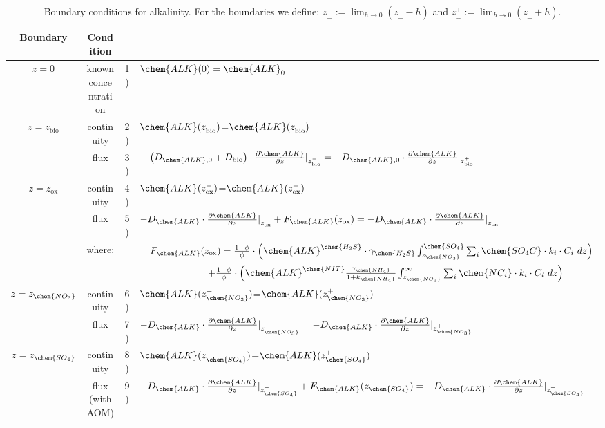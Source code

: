 \documentclass[gmd, manuscript]{copernicus}
\begin{document}
\begin{table}[tbp]
\caption{Boundary conditions for alkalinity. For the boundaries we define:  $z^-_{\_\_} := \lim_{h\to0} (z_{\_\_}-h)$ and $z^+_{\_\_} := \lim_{h\to0} (z_{\_\_}+h)$.}
\centering
\begin{tabular}{ |c| c| c l|}
\hline
\textbf{Boundary}& \textbf{Condition}&&\\
\hline
$z=0$& known concentration& 1)& $\chem{ALK}(0)=\chem{ALK}_{0}$  \\
$z=z_{\mathrm{bio}}$&continuity& 2)& $\chem{ALK}(z_{\mathrm{bio}}^-)$=$\chem{ALK}(z_{\mathrm{bio}}^+)$\\
               & flux & 3)& $-\left(D_{\chem{ALK},0}+D_{\mathrm{bio}}\right )\cdot \frac{\partial \chem{ALK}}{\partial z}|_{z_{\mathrm{bio}}^-}=-D_{\chem{ALK},0} \cdot \frac{\partial \chem{ALK}}{\partial z}|_{z_{\mathrm{bio}}^+}$\\
$z=z_{\mathrm{ox}}$& continuity& 4)& $\chem{ALK}(z_{\mathrm{ox}}^-)$=$\chem{ALK}(z_{\mathrm{ox}}^+)$\\
               & flux & 5)& $-D_{\chem{ALK}} \cdot \frac{\partial \chem{ALK}}{\partial z}|_{z_{\mathrm{ox}}^-} +  F_{\chem{ALK}}(z_{\mathrm{ox}})=-D_{\chem{ALK}} \cdot \frac{\partial \chem{ALK}}{\partial z}|_{z_{\mathrm{ox}}^+}$\\
&where: & &$\quad F_{\chem{ALK}}(z_{\mathrm{ox}})=\frac{1-\phi}{\phi} \cdot \left( \chem{ALK}^\chem{H_2S}\cdot \gamma_\chem{H_2S} \int_{z_{\chem{NO_3}}}^{\chem{SO_4}} \sum_i \chem{SO_4C} \cdot k_i \cdot C_i\ dz \right)$\\
& & &$\qquad \qquad \qquad \quad + \frac{1-\phi}{\phi} \cdot \left(\chem{ALK}^\chem{NIT} \frac{\gamma_\chem{NH_4}}{1+k_\chem{NH_4}}\int_{z_{\chem{NO_3}}}^{\infty}  \sum_i \chem{NC_i} \cdot k_i \cdot C_i\ dz \right)$\\            
$z=z_{\chem{NO_3}}$&continuity& 6)& $\chem{ALK}(z_{\chem{NO_3}}^-)$=$\chem{ALK}(z_{\chem{NO_3}}^+)$\\
               & flux & 7)& $-D_{\chem{ALK}}\cdot \frac{\partial \chem{ALK}}{\partial z}|_{z_{\chem{NO_3}}^-}=-D_{\chem{ALK}} \cdot \frac{\partial \chem{ALK}}{\partial z}|_{z_{\chem{NO_3}}^+}$\\
$z=z_{\chem{SO_4}}$& continuity & 8)& $\chem{ALK}(z_{\chem{SO_4}}^-)$=$\chem{ALK}(z_{\chem{SO_4}}^+)$\\ %
               & flux (with AOM) & 9)&  $-D_{\chem{ALK}}\cdot \frac{\partial \chem{ALK}}{\partial z}|_{z_{\chem{SO_4}}^-} + F_{\chem{ALK}}(z_{\chem{SO_4}})=-D_{\chem{ALK}} \cdot \frac{\partial \chem{ALK}}{\partial z}|_{z_{\chem{SO_4}}^+}$\\

\end{tabular}
\end{table}
\end{document}

